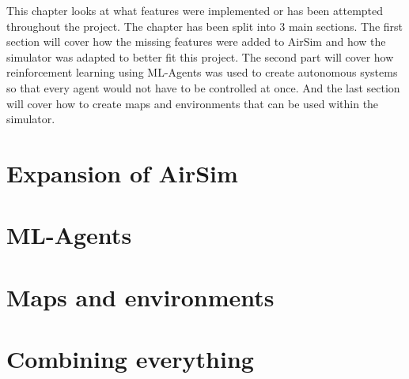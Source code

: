 This chapter looks at what features were implemented or has been attempted throughout the project. The chapter has been split into 3 main sections. The first section will cover how the missing features were added to AirSim and how the simulator was adapted to better fit this project. The second part will cover how reinforcement learning using ML-Agents was used to create autonomous systems so that every agent would not have to be controlled at once. And the last section will cover how to create maps and environments that can be used within the simulator. 

\section{Expansion of AirSim} \label{06:airsim}


\section{ML-Agents}


\section{Maps and environments}


\section{Combining everything}

